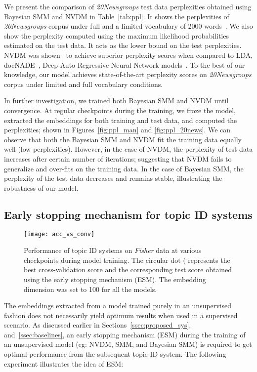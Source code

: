 \documentclass[journal]{IEEEtran}
\begin{document}
We present the comparison of \textit{20Newsgroups} test data perplexities 
obtained using Bayesian SMM and NVDM in Table~\ref{tab:ppl}. It shows the 
perplexities of \textit{20Newsgroups} corpus under full and a limited 
vocabulary of 2000 words~\cite{NVI:2016}. We also show the perplexity computed 
using the maximum likelihood probabilities estimated on the test data. It acts 
as the lower bound on the test perplexities. NVDM was shown~\cite{NVI:2016} to 
achieve superior perplexity scores when compared to LDA, 
docNADE~\cite{Hugo:2012:DocNADE}, Deep Auto Regressive Neural Network 
models~\cite{Mnih:2014:NVI}. To the best of our knowledge, our model achieves 
state-of-the-art perplexity scores on \textit{20Newsgroups} corpus under 
limited and full vocabulary conditions.



In further investigation, we trained both Bayesian SMM and NVDM until 
convergence. At regular checkpoints during the training, we froze the model, 
extracted the embeddings for both training and test data, and computed the 
perplexities; shown in Figures~\ref{fig:ppl_man} and \ref{fig:ppl_20news}. We 
can observe that both the Bayesian SMM and NVDM fit the training data equally 
well (low perplexities). However, in the case of NVDM, the perplexity of test 
data increases after certain number of iterations; suggesting that NVDM fails 
to generalize and over-fits on the training data. In the case of Bayesian SMM, 
the perplexity of the test data decreases and remains stable, illustrating the 
robustness of our model. 

\subsection{Early stopping mechanism for topic ID systems}
\label{ssec:ease_of_training}
\begin{figure*}[t!]
  \centering
  \texttt{[image: acc\_vs\_conv]}
  \caption{\label{fig:acc_conv} Performance of topic ID systems on     
  \textit{Fisher} data at various checkpoints during model training. The 
  circular dot ( represents the best cross-validation score and the 
  corresponding test score obtained using the early stopping mechanism (ESM). 
  The embedding dimension was set to 100 for all the models.} 
\end{figure*}
The embeddings extracted from a model trained purely in an unsupervised fashion 
does not necessarily yield optimum results when used in a supervised 
scenario. As discussed earlier in Sections~\ref{ssec:proposed_sys}, 
and~\ref{ssec:baselines}, an early stopping mechanism (ESM) during the training 
of an unsupervised model (eg: NVDM, SMM, and Bayesian SMM) is required to get 
optimal performance from the subsequent topic ID system. The following 
experiment illustrates the idea of ESM:
\end{document}
